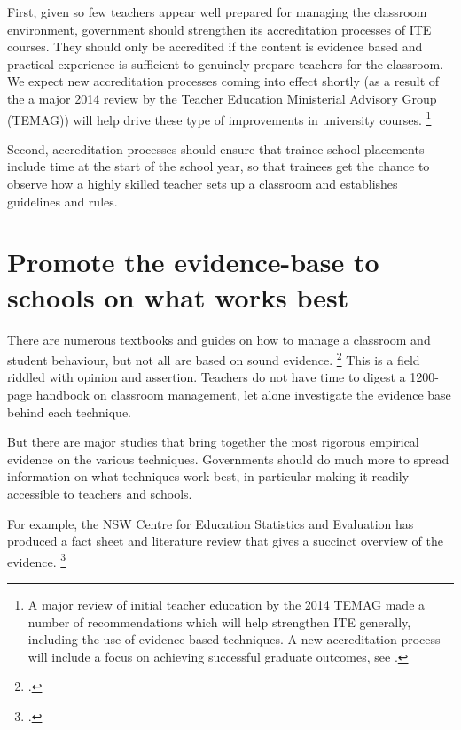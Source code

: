 \documentclass[FrontPage]{grattan}
\begin{document}
First, given so few teachers appear well prepared for managing the classroom environment, government should strengthen its accreditation processes of ITE courses. They should only be accredited if the content is evidence based and practical experience is sufficient to genuinely prepare teachers for the classroom. 
We expect new accreditation processes coming into effect shortly (as a result of the a major 2014 review by the Teacher Education Ministerial Advisory Group (TEMAG)) will help drive these type of improvements in university courses.%
    \footnote{A major review of initial teacher education by the 2014 TEMAG made a number of recommendations which will help strengthen ITE generally, including the use of evidence-based techniques. A new accreditation process will include a focus on achieving successful graduate outcomes, see \textcite{TEMAG2016ActionNowClassroom}.}

Second, accreditation processes should ensure that trainee school placements include time at the start of the school year, so that trainees get the chance to observe how a highly skilled teacher sets up a classroom and establishes guidelines and rules.

\section{Promote the evidence-base to schools on what works best }\label{sec:provide-information-teachers}
There are numerous textbooks and guides on how to manage a classroom and student behaviour, but not all are based on sound evidence.%
    \footcite{ONeillStephenson2014EvidenceBasedClassroom}
This is a field riddled with opinion and assertion. Teachers do not have time to digest a 1200-page handbook on classroom management, let alone investigate the evidence base behind each technique.

But there are major studies that bring together the most rigorous empirical evidence on the various techniques. Governments should do much more to spread information on what techniques work best, in particular making it readily accessible to teachers and schools. 

For example, the NSW Centre for Education Statistics and Evaluation has produced a fact sheet and literature review that gives a succinct overview of the evidence.%
    \footcites{CESE2014ClassroomManagement}{CESE2014WhatEffectiveClassroom}
\end{document}

